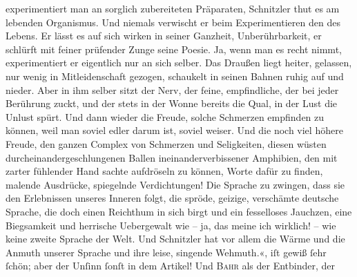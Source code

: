 {{{                     experimentiert man an sorglich zubereiteten Präparaten, Schnitzler thut es am lebenden Organismus. Und niemals
                     verwischt er beim Experimentieren den  des
                     Lebens. Er lässt es auf sich wirken in seiner Ganzheit, Unberührbarkeit, er
                     schlürft mit feiner prüfender Zunge seine Poesie. Ja, wenn man es recht nimmt,
                     experimentiert er eigentlich nur an sich selber. Das Draußen liegt heiter,
                     gelassen, nur wenig in Mitleidenschaft gezogen, schaukelt in seinen Bahnen
                     ruhig auf und nieder. Aber in ihm selber sitzt der Nerv, der feine,
                     empfindliche, der bei jeder Berührung zuckt, und der stets in der Wonne bereits
                     die Qual, in der Lust die Unlust spürt. Und dann wieder die Freude, solche
                     Schmerzen empfinden zu können, weil man soviel edler darum ist, soviel weiser.
                     Und die noch viel höhere Freude, den ganzen Complex von Schmerzen und
                     Seligkeiten, diesen wüsten durcheinandergeschlungenen Ballen
                     ineinanderverbissener Amphibien, den mit zarter fühlender Hand sachte
                     aufdröseln zu können, Worte dafür zu finden, malende Ausdrücke, spiegelnde
                     Verdichtungen! Die Sprache zu zwingen, dass sie den Erlebnissen unseres Inneren
                     folgt, die spröde, geizige, verschämte deutsche Sprache, die doch einen
                     Reichthum in sich birgt und ein fesselloses Jauchzen, eine Biegsamkeit und
                     herrische Uebergewalt wie – ja, das meine ich wirklich! – wie keine zweite
                     Sprache der Welt. Und Schnitzler hat vor
                     allem die Wärme und die Anmuth unserer Sprache und ihre leise, singende
                     Wehmuth.«}}}\label{K_L02792-21}, iſt {\pb}gewiß{ }ſehr{ }ſchön; aber der Unſinn{ }ſonſt in dem Artikel! Und \textsc{Bahr} als der Entbinder, der \label{K_L02792-22v}
